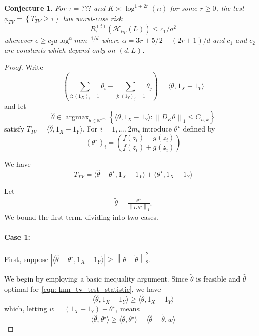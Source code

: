 \documentclass{article}
\newcommand{\Reals}{\mathbb{R}}
\newcommand{\norm}[1]{\left\lVert#1\right\rVert}
\newcommand{\abs}[1]{\left \lvert #1 \right \rvert}
\newcommand{\set}[1]{\left\{#1\right\}}
\newcommand{\dotp}[2]{\langle #1, #2 \rangle}
\newcommand{\1}{\mathbb{I}}
\DeclareMathOperator*{\argmax}{argmax}
\newcommand{\Hclass}{\mathcal{H}}
\theoremstyle{alden}
\theoremstyle{aldenthm}
\newtheorem{conjecture}{Conjecture}
\theoremstyle{definition}
\theoremstyle{remark}
\begin{document}
\begin{conjecture}
	For $\tau = ???$ and $K \asymp \log^{1 + 2r}(n)$ for some $r \geq 0$, the test $\phi_{TV} = \set{T_{TV} \geq \tau}$ has worst-case risk
	\begin{equation*}
	R_{\epsilon}^{(t)}(\Hclass_{lip}(L)) \leq c_1/a^2
	\end{equation*}
	whenever $\epsilon \geq c_2 a \log^{\alpha}m m^{-1/d}$ where $\alpha = 3r + 5/2 + (2r + 1)/d$ and $c_1$ and $c_2$ are constants which depend only on $(d,L)$.
\end{conjecture}
\begin{proof}
	Write
	\begin{equation*}
	\left(\sum_{i: (1_X)_i = 1} \theta_i - \sum_{j:(1_Y)_j = 1} \theta_j\right) = \dotp{\theta}{1_X - 1_Y}
	\end{equation*}
	and let
	\begin{equation*}
	\widehat{\theta} \in \argmax_{\theta \in \Reals^{2m}} \set{\dotp{\theta}{1_X - 1_Y}: \norm{D_K \theta}_1 \leq C_{n,k}}
	\end{equation*}
	satisfy $T_{TV} = \dotp{\widehat{\theta}}{1_X - 1_Y}$. For $i = 1, \ldots, 2m$, introduce $\theta^{\star}$ defined by
	\begin{equation*}
	(\theta^{\star})_i = \left(\frac{f(z_i) - g(z_i)}{f(z_i) + g(z_i)} \right)	\end{equation*}
	
	We have
	\begin{equation*}
	T_{TV} = \dotp{\widehat{\theta} - \theta^{\star}}{1_X - 1_Y} + \dotp{\theta^{\star}}{1_X - 1_Y}
	\end{equation*}
	
	 Let
	\begin{align*}
	\widetilde{\theta} = \frac{\theta^{\star}}{\norm{D\theta^{\star}}_1}.
	\end{align*}
	We bound the first term, dividing into two cases.
	\paragraph{Case 1:} First, suppose $\abs{\dotp{\widehat{\theta} - \theta^{\star}}{1_X - 1_Y}} \geq \norm{\theta - \widetilde{\theta}}_2^2$.
	
	We begin by employing a basic inequality argument.
	Since $\widetilde{\theta}$ is feasible and $\widehat{\theta}$ optimal for \eqref{eqn: knn_tv_test_statistic}, we have
	\begin{equation*}
	\dotp{\widehat{\theta}}{1_X - 1_Y} \geq \dotp{\widetilde{\theta}}{1_X - 1_Y}
	\end{equation*}
	which, letting $w = (1_X - 1_Y) - \theta^{\star}$, means
	\begin{equation}
	\label{eqn: basic_inequality_1}
	\dotp{\widehat{\theta}}{\theta^{\star}} \geq \dotp{\widetilde{\theta}}{\theta^{\star}} - \dotp{\widehat{\theta} - \widetilde{\theta}}{w}
	\end{equation}
	

\end{proof}
\end{document}

